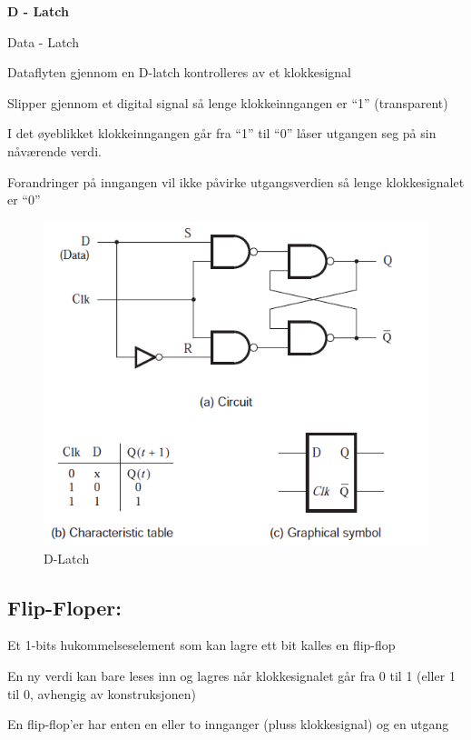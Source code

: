 \documentclass{article}
\begin{document}
	\textbf{D - Latch}
	
	Data - Latch
		
	Dataflyten gjennom en  D-­latch  kontrolleres av et  klokkesignal
	
	Slipper  gjennom et  digital  signal  så lenge klokkeinngangen er “1” (transparent)
	
	I  det øyeblikket klokkeinngangen går fra “1”  til “0”  låser utgangen seg på sin nåværende verdi.  
	
	Forandringer på	inngangen vil ikke påvirke utgangsverdien så lenge klokkesignalet er “0”
	
	\begin{figure}[H]
		\includegraphics[scale = 0.6]{dL.png}
		\caption{D-Latch}
	\end{figure}
	
	
	\subsection{Flip-Floper:}
	Et 1-bits hukommelseselement som kan	lagre ett bit kalles en flip-flop
	
	En ny verdi kan	bare leses inn og lagres når klokkesignalet går fra 0 til 1 (eller 1 til 0, avhengig av konstruksjonen)
	
	En flip-flop’er har	enten en eller to innganger (pluss klokkesignal) og en utgang
	
\end{document}
